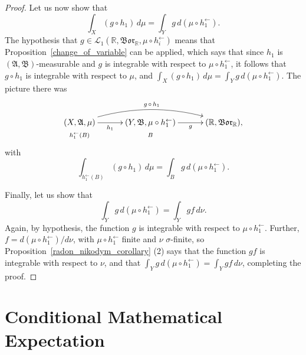 \documentclass[
twoside=true,
paper=letter,
fontsize=9pt,
pagesize=auto,
leqno,
openany,
headsepline,
overfullrule,
]{scrbook}
\theoremstyle{plain}
\theoremstyle{plain}
\theoremstyle{definition}
\theoremstyle{bfnoteitalic}
\theoremstyle{bfnoteroman}
\newcommand{\sigalg}[1]{\mathfrak{#1}}
\newcommand{\cali}[1]{\mathscr{#1}}
\newcommand{\borel}{\mathfrak{Bor}}
\newcommand{\textsigma}{\hbox{\large{$\sigma$}}\kern-1pt}
\newcommand{\preimage}[1]{#1^{\leftarrow}}
\newcommand{\R}{\mathbb{R}}
\newcommand{\sigmaalgebra}{\sigalg{A}}
\newcommand{\sigmaalgebraii}{\sigalg{B}}
\newcommand{\funcf}{f}
\newcommand{\funcg}{g}
\newcommand{\funch}{h}
\newcommand{\functionii}{g}
\newcommand{\functioniii}{h}
\newcommand{\measurespace}{X}
\newcommand{\measurespaceii}{Y}
\newcommand{\measure}{\mu}
\newcommand{\measmu}{\mu}
\newcommand{\measnu}{\nu}
\newcommand{\setii}{B}
\begin{document}
\begin{proof}
Let us now show that
\[
\int_\measurespace (\funcg \circ \funch_1) \,d\measure
=
\int_\measurespaceii \funcg \, d(\measmu\circ \preimage{\funch_1}) .
\]
The hypothesis that
$\functionii \in\cali{L}_1(\R, \borel_\R,\measure\circ\preimage{\functioniii_i})$
means that Proposition~\ref{change_of_variable}  can be applied, which says that since 
$\funch_1$ is 
$(\sigmaalgebra,\sigmaalgebraii)$\hyp{}measurable and
$\funcg$ is integrable with respect to 
$\measmu \circ \preimage{\funch_1}$, it follows that 
$\funcg \circ \funch_1$ 
is integrable with respect to $\measmu$, and
$\int_\measurespace (\funcg\circ\funch_1)\,d\mu
=
\int_\measurespaceii \funcg \, d(\measmu\circ \preimage{\funch_1})$. The picture there was
\[
\xymatrix@R=0pt@C=30pt{ 
(\measurespace,\sigmaalgebra,\measure)
\ar[r]_-{\funch_1} \ar@/^16pt/[rr]^{\funcg\, \circ\, \funch_1}
& (\measurespaceii,\sigmaalgebraii,\measmu\circ \preimage{\funch_1}) 
\ar[r]_-{\funcg}
& (\R,\borel_\R), \\
\scriptstyle{\preimage{\funch_1}(\setii)} & \scriptstyle{\setii} & \\
}
\]
with
\[
\int_{\preimage{\funch_1}(\setii)} (\funcg \circ \funch_1) \, d\measure
= \int_\setii \funcg \, d(\measmu\circ \preimage{\funch_1}).
\]

Finally, let us show that 
\[
\int_\measurespaceii \funcg \, d(\measmu\circ \preimage{\funch_1})
=
\int_\measurespaceii \funcg \funcf \, d\measnu.
\]
Again, by hypothesis, the function $\funcg$ is integrable with respect to 
$\measmu\circ \preimage{\funch_1}$. Further, 
$\funcf = d(\measmu\circ\preimage{\funch_1})/d\measnu$, with 
$\measmu\circ\preimage{\funch_1}$ finite and $\measnu$ \textsigma-finite, so
Proposition~\ref{radon_nikodym_corollary} (2) says that the function
$\funcg\funcf$
is integrable with respect to $\measnu$, and that
$\int_\measurespaceii \funcg \, d(\measmu\circ \preimage{\funch_1})
=
\int_\measurespaceii \funcg \funcf \, d\measnu$,
completing the proof.
\end{proof}






\chapter{Conditional Mathematical Expectation}
\end{document}
